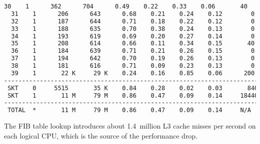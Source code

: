 \begin{lstlisting}[language=TeX]
  30    1      362      704      0.49    0.22    0.33    0.06       40
  31    1      206      643      0.68    0.21    0.24    0.12        0
  32    1      187      644      0.71    0.18    0.22    0.12        0
  33    1      188      635      0.70    0.38    0.24    0.13        0
  34    1      193      619      0.69    0.20    0.27    0.14        0
  35    1      208      614      0.66    0.11    0.34    0.15       40
  36    1      184      639      0.71    0.21    0.26    0.15        0
  37    1      194      642      0.70    0.19    0.26    0.13        0
  38    1      181      616      0.71    0.09    0.23    0.13        0
  39    1       22 K     29 K    0.24    0.16    0.85    0.06      200
------------------------------------------------------------------------
 SKT    0     5515       35 K    0.84    0.28    0.02    0.03       840
 SKT    1       11 M     79 M    0.86    0.47    0.09    0.14     18440
------------------------------------------------------------------------
 TOTAL  *       11 M     79 M    0.86    0.47    0.09    0.14     N/A
\end{lstlisting}
The FIB table lookup introduces about 1.4~million L3 cache misses per second on each logical CPU,
which is the source of the performance drop.
